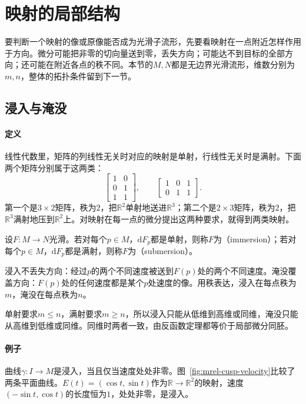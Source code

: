 \section{映射的局部结构}
\label{sec:mrel-local-structure}

要判断一个映射的像或原像能否成为光滑子流形，先要看映射在一点附近怎样作用于方向。微分可能把非零的切向量送到零，丢失方向；可能达不到目标的全部方向；还可能在附近各点的秩不同。本节的$M,N$都是无边界光滑流形，维数分别为$m,n$，整体的拓扑条件留到下一节。

\subsection{浸入与淹没}
\label{sec:mrel-immersion-submersion}

\paragraph{定义}
线性代数里，矩阵的列线性无关时对应的映射是单射，行线性无关时是满射。下面两个矩阵分别属于这两类：
\[
\begin{bmatrix}1&0\\0&1\\1&1\end{bmatrix},\qquad
\begin{bmatrix}1&0&1\\0&1&1\end{bmatrix}.
\]
第一个是$3\times2$矩阵，秩为$2$，把$\mathbb R^2$单射地送进$\mathbb R^3$；第二个是$2\times3$矩阵，秩为$2$，把$\mathbb R^3$满射地压到$\mathbb R^2$上。对映射在每一点的微分提出这两种要求，就得到两类映射。

\begin{definition}[浸入与淹没]
\label{def:mrel-immersion-submersion}
设$F:M\to N$光滑。若对每个$p\in M$，$\mathrm dF_p$都是单射，则称$F$为（immersion）；若对每个$p\in M$，$\mathrm dF_p$都是满射，则称$F$为（submersion）。
\end{definition}

浸入不丢失方向：经过$p$的两个不同速度被送到$F(p)$处的两个不同速度。淹没覆盖方向：$F(p)$处的任何速度都是某个$p$处速度的像。用秩表达，浸入在每点秩为$m$，淹没在每点秩为$n$。

单射要求$m\leq n$，满射要求$m\geq n$，所以浸入只能从低维到高维或同维，淹没只能从高维到低维或同维。同维时两者一致，由反函数定理都等价于局部微分同胚。

\paragraph{例子}
曲线$\gamma:I\to M$是浸入，当且仅当速度处处非零。图~\ref{fig:mrel-cusp-velocity}比较了两条平面曲线。$E(t)=(\cos t,\sin t)$作为$\mathbb R\to\mathbb R^2$的映射，速度$(-\sin t,\cos t)$的长度恒为$1$，处处非零，是浸入。

